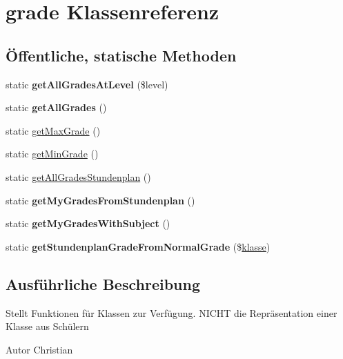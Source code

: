 \hypertarget{classgrade}{}\section{grade Klassenreferenz}
\label{classgrade}
\subsection*{Öffentliche, statische Methoden}
\begin{DoxyCompactItemize}
\item 
\mbox{\label{classgrade_a4531d983bc4e2ad3b47858f34388c4ce}} 
static {\bfseries get\+All\+Grades\+At\+Level} (\$level)
\item 
\mbox{\label{classgrade_a13ec0b3aae2c5f95229d25011080af0c}} 
static {\bfseries get\+All\+Grades} ()
\item 
static \mbox{\hyperlink{classgrade_ac93d7d41cb50a82bee5ded1fbd5a75aa}{get\+Max\+Grade}} ()
\item 
static \mbox{\hyperlink{classgrade_a822f994d13a560b46f3edef3b824a45e}{get\+Min\+Grade}} ()
\item 
static \mbox{\hyperlink{classgrade_aff8e296e9340096f5b67eee893570a43}{get\+All\+Grades\+Stundenplan}} ()
\item 
\mbox{\label{classgrade_aedb66d7aa2cbddff1a61d829fc1401e8}} 
static {\bfseries get\+My\+Grades\+From\+Stundenplan} ()
\item 
\mbox{\label{classgrade_a5a1f610470329447e2ed1e9da428d789}} 
static {\bfseries get\+My\+Grades\+With\+Subject} ()
\item 
\mbox{\label{classgrade_a576663fe7d2958b6574b761e63cbaf8f}} 
static {\bfseries get\+Stundenplan\+Grade\+From\+Normal\+Grade} (\$\mbox{\hyperlink{classklasse}{klasse}})
\end{DoxyCompactItemize}


\subsection{Ausführliche Beschreibung}
Stellt Funktionen für Klassen zur Verfügung. N\+I\+C\+HT die Repräsentation einer Klasse aus Schülern \begin{DoxyAuthor}{Autor}
Christian 
\end{DoxyAuthor}


